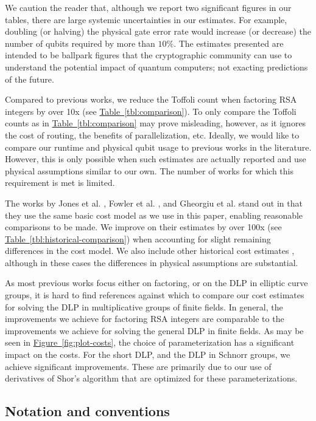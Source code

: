 \documentclass[a4paper, onecolumn, accepted=2021-03-29]{quantumarticle}
\newcommand{\fig}[1]{\hyperref[fig:#1]{Figure~\ref*{fig:#1}}}
\newcommand{\tbl}[1]{\hyperref[tbl:#1]{Table~\ref*{tbl:#1}}}
\begin{document}
We caution the reader that, although we report two significant figures in our tables, there are large systemic uncertainties in our estimates.
For example, doubling (or halving) the physical gate error rate would increase (or decrease) the number of qubits required by more than $10\%$.
The estimates presented are intended to be ballpark figures that the cryptographic community can use to understand the potential impact of quantum computers; not exacting predictions of the future.

Compared to previous works, we reduce the Toffoli count when factoring RSA integers by over 10x (see \tbl{comparison}).
To only compare the Toffoli counts as in \tbl{comparison} may prove misleading, however, as it ignores the cost of routing, the benefits of parallelization, etc.
Ideally, we would like to compare our runtime and physical qubit usage to previous works in the literature.
However, this is only possible when such estimates are actually reported and use physical assumptions similar to our own.
The number of works for which this requirement is met is limited.

The works by Jones et al. \cite{jones2012layered}, Fowler et al. \cite{fowler2012surfacecodereview}, and Gheorgiu et al. \cite{gheorghiu2019cryptanalysis} stand out in that they use the same basic cost model as we use in this paper, enabling reasonable comparisons to be made.
We improve on their estimates by over 100x (see \tbl{historical-comparison}) when accounting for slight remaining differences in the cost model.
We also include other historical cost estimates \cite{van2010distributed,ogorman2017factories}, although in these cases the differences in physical assumptions are substantial.

As most previous works focus either on factoring, or on the DLP in elliptic curve groups, it is hard to find references against which to compare our cost estimates for solving the DLP in multiplicative groups of finite fields.
In general, the improvements we achieve for factoring RSA integers are comparable to the improvements we achieve for solving the general DLP in finite fields.
As may be seen in \fig{plot-costs}, the choice of parameterization has a significant impact on the costs.
For the short DLP, and the DLP in Schnorr groups, we achieve significant improvements.
These are primarily due to our use of derivatives of Shor's algorithm that are optimized for these parameterizations.

\subsection{Notation and conventions}
\end{document}
